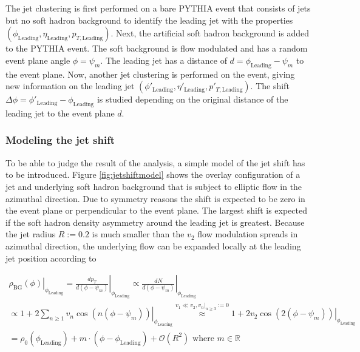 \documentclass[
  a4paper,
  12pt,
  oneside,
  parskip=half,
  listof=totoc,
  bibliography=totoc,
  DIV=12,
  numbers=noenddot,
  BA.tex
  ]{subfiles}
\begin{document}
The jet clustering is first performed on a bare PYTHIA event that consists of jets but no soft hadron background to identify the leading jet with the properties $(\phi_{\text{Leading}}, \eta_{\text{Leading}}, p_{T,\text{Leading}})$. Next, the artificial soft hadron background is added to the PYTHIA event. The soft background is flow modulated and has a random event plane angle $\phi = \psi_m$. The leading jet has a distance of $d = \phi_{\text{Leading}} - \psi_m$ to the event plane. Now, another jet clustering is performed on the event, giving new information on the leading jet $(\phi'_{\text{Leading}}, \eta'_{\text{Leading}}, p'_{T,\text{Leading}})$. The shift $\Delta \phi = \phi'_{\text{Leading}} - \phi_{\text{Leading}}$ is studied depending on the original distance of the leading jet to the event plane $d$. 

\subsubsection{Modeling the jet shift}
\label{sec:modeling-jet-shift}

To be able to judge the result of the analysis, a simple model of the jet shift has to be introduced. Figure \ref{fig:jetshiftmodel} shows the overlay configuration of a jet and underlying soft hadron background that is subject to elliptic flow in the azimuthal direction. Due to symmetry reasons the shift is expected to be zero in the event plane or perpendicular to the event plane. The largest shift is expected if the soft hadron density asymmetry around the leading jet is greatest. Because the jet radius $R := 0.2$ is much smaller than the $v_2$ flow modulation spreads in azimuthal direction, the underlying flow can be expanded locally at the leading jet position according to

\begin{equation}
	\begin{gathered}
		\left. \rho_\text{BG}(\phi) \right|_{\phi_\text{Leading}} = \left. \frac{d p_T}{d (\phi - \psi_m)} \right|_{\phi_\text{Leading}} \propto \left. \frac{d N}{d (\phi - \psi_m)} \right|_{\phi_\text{Leading}} \\ \propto \left. 1 + 2 \sum_{n \geq 1}^{} v_n \cos(n (\phi - \psi_m)) \right|_{\phi_\text{Leading}}
		\stackrel{v_1 \ll v_2, v_n|_{n \geq 3} := 0}{\approx} \left. 1 + 2v_2 \cos(2(\phi - \psi_m)) \right|_{\phi_\text{Leading}}\\
		= \rho_0(\phi_\text{Leading}) + m \cdot (\phi - \phi_\text{Leading}) + \mathcal{O}(R^2) \text{ where } m \in \mathbb{R}
	\end{gathered}
	\label{eq:background_density}
\end{equation}
\end{document}
